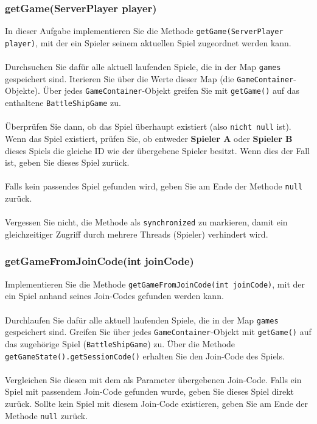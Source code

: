 \documentclass[12pt]{article}
\begin{document}
\subsubsection*{getGame(ServerPlayer player)}

In dieser Aufgabe implementieren Sie die Methode \texttt{getGame(ServerPlayer player)}, 
mit der ein Spieler seinem aktuellen Spiel zugeordnet werden kann.
\\ \\
Durchsuchen Sie dafür alle aktuell laufenden Spiele, die in der Map \texttt{games} gespeichert sind. 
Iterieren Sie über die Werte dieser Map (die \texttt{GameContainer}-Objekte). 
Über jedes \texttt{GameContainer}-Objekt greifen Sie mit \texttt{getGame()} auf das enthaltene \texttt{BattleShipGame} zu.
\\ \\
Überprüfen Sie dann, ob das Spiel überhaupt existiert (also \texttt{nicht null} ist). 
Wenn das Spiel existiert, prüfen Sie, ob entweder \textbf{Spieler A} oder \textbf{Spieler B} dieses Spiels 
die gleiche ID wie der übergebene Spieler besitzt. 
Wenn dies der Fall ist, geben Sie dieses Spiel zurück.
\\ \\
Falls kein passendes Spiel gefunden wird, geben Sie am Ende der Methode \texttt{null} zurück.
\\ \\
Vergessen Sie nicht, die Methode als \texttt{synchronized} zu markieren, 
damit ein gleichzeitiger Zugriff durch mehrere Threads (Spieler) verhindert wird.

\subsubsection*{getGameFromJoinCode(int joinCode)}

Implementieren Sie die Methode \texttt{getGameFromJoinCode(int joinCode)}, 
mit der ein Spiel anhand seines Join-Codes gefunden werden kann.
\\ \\
Durchlaufen Sie dafür alle aktuell laufenden Spiele, die in der Map \texttt{games} gespeichert sind. 
Greifen Sie über jedes \texttt{GameContainer}-Objekt mit \texttt{getGame()} auf das zugehörige Spiel (\texttt{BattleShipGame}) zu. 
Über die Methode \texttt{getGameState().getSessionCode()} erhalten Sie den Join-Code des Spiels.
\\ \\
Vergleichen Sie diesen mit dem als Parameter übergebenen Join-Code. 
Falls ein Spiel mit passendem Join-Code gefunden wurde, geben Sie dieses Spiel direkt zurück. 
Sollte kein Spiel mit diesem Join-Code existieren, geben Sie am Ende der Methode \texttt{null} zurück.
\end{document}
